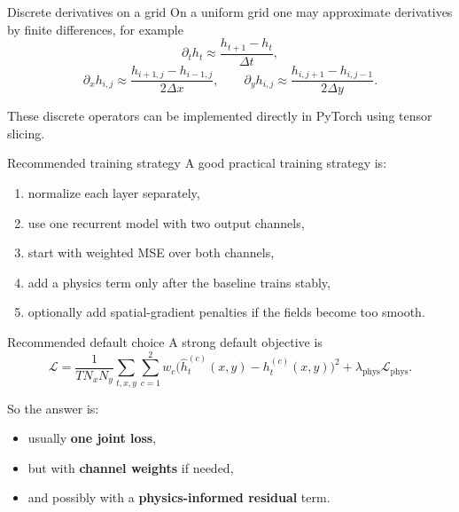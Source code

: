 \documentclass[aspectratio=169]{beamer}
\begin{document}
\begin{frame}{Discrete derivatives on a grid}
On a uniform grid one may approximate derivatives by finite differences, for example
\[
\partial_t h_t \approx \frac{h_{t+1}-h_t}{\Delta t},
\]
\[
\partial_x h_{i,j} \approx \frac{h_{i+1,j}-h_{i-1,j}}{2\Delta x},
\qquad
\partial_y h_{i,j} \approx \frac{h_{i,j+1}-h_{i,j-1}}{2\Delta y}.
\]

These discrete operators can be implemented directly in PyTorch using tensor slicing.
\end{frame}

\begin{frame}{Recommended training strategy}
A good practical training strategy is:
\begin{enumerate}
\item normalize each layer separately,
\item use one recurrent model with two output channels,
\item start with weighted MSE over both channels,
\item add a physics term only after the baseline trains stably,
\item optionally add spatial-gradient penalties if the fields become too smooth.
\end{enumerate}
\end{frame}

\begin{frame}{Recommended default choice}
A strong default objective is
\[
\mathcal{L}
=
\frac{1}{T N_x N_y}
\sum_{t,x,y}
\sum_{c=1}^{2}
w_c\bigl(\hat h_t^{(c)}(x,y)-h_t^{(c)}(x,y)\bigr)^2
+
\lambda_{\mathrm{phys}}\mathcal{L}_{\mathrm{phys}}.
\]

So the answer is:
\begin{itemize}
\item usually \textbf{one joint loss},
\item but with \textbf{channel weights} if needed,
\item and possibly with a \textbf{physics-informed residual} term.
\end{itemize}
\end{frame}
\end{document}
